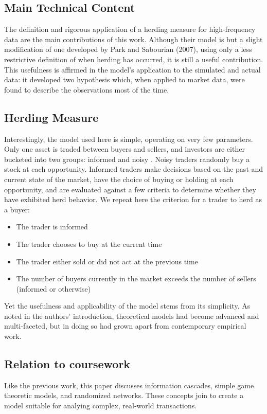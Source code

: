 \documentclass{article}
\begin{document}
\subsection{Main Technical Content}  
  The definition and rigorous application of a herding measure for high-frequency data are the main contributions of this work.
  Although their model is but a slight modification of one developed by Park and Sabourian (2007), using only a less restrictive definition of when herding has occurred, it is still a useful contribution.
  This usefulness is affirmed in the model's application to the simulated and actual data: it developed two hypothesis which, when applied to market data, were found to describe the observations most of the time.

\subsection{Herding Measure}  
  Interestingly, the model used here is simple, operating on very few parameters. 
  Only one asset is traded between buyers and sellers, and investors are either bucketed into two groups: informed and noisy \cite[5]{boortz}.
  Noisy traders randomly buy a stock at each opportunity.
  Informed traders make decisions based on the past and current state of the market, have the choice of buying or holding at each opportunity, and are evaluated against a few criteria to determine whether they have exhibited herd behavior.
  We repeat here the criterion for a trader to herd as a buyer:
  \begin{itemize}
  \item 
    The trader is informed
  \item
    The trader chooses to buy at the current time
  \item 
    The trader either sold or did not act at the previous time
  \item 
    The number of buyers currently in the market exceeds the number of sellers (informed or otherwise)
  \end{itemize}
  Yet the usefulness and applicability of the model stems from its simplicity. 
  As noted in the authors' introduction, theoretical models had become advanced and multi-faceted, but in doing so had grown apart from contemporary empirical work.

\subsection{Relation to coursework}
  Like the previous work, this paper discusses information cascades, simple game theoretic models, and randomized networks.
  These concepts join to create a model suitable for analying complex, real-world transactions.
\end{document}
